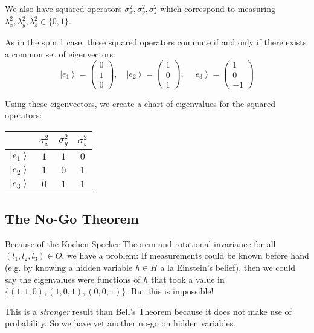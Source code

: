 \documentclass[12pt]{article}
\newcommand{\ket}[1]{\left\vert #1 \right\rangle}
\begin{document}
        We also have squared operators $\sigma_x^2, \sigma_y^2, \sigma_z^2$ which correspond to measuring $\lambda_x^2, \lambda_y^2, \lambda_z^2 \in \{0, 1\}$.

        As in the spin 1 case, these squared operators commute if and only if there exists a common set of eigenvectors: 
        \[\ket{e_1} = \begin{pmatrix}
            0\\1\\0
        \end{pmatrix}, \quad \ket{e_2} = \begin{pmatrix}
            1\\0\\1
        \end{pmatrix}, \quad \ket{e_3} = \begin{pmatrix}
            1\\0\\-1
        \end{pmatrix}\]

        Using these eigenvectors, we create a chart of eigenvalues for the squared operators:
        \begin{center}
            \begin{tabular*}{2in}{|c|ccc|}
                \hline 
                & $\sigma_x^2$ & $\sigma_y^2$ & $\sigma_z^2$\\
                \hline
                $\ket{e_1}$ & $1$ & $1$ & $0$\\
                $\ket{e_2}$ & $1$ & $0$ & $1$\\
                $\ket{e_3}$ & $0$ & $1$ & $1$\\
                \hline
            \end{tabular*}
        \end{center}

    \subsection*{The No-Go Theorem}
        Because of the Kochen-Specker Theorem and rotational invariance for all $(l_1, l_2, l_3) \in O$, we have a problem: If measurements could be known before hand (e.g. by knowing a hidden variable $h \in H$ a la Einstein's belief), then we could say the eigenvalues were functions of $h$ that took a value in $\{(1, 1, 0), (1, 0, 1), (0, 0, 1)\}$. But this is impossible!

        This is a \emph{stronger} result than Bell's Theorem because it does not make use of probability. So we have yet another no-go on hidden variables.
\end{document}
